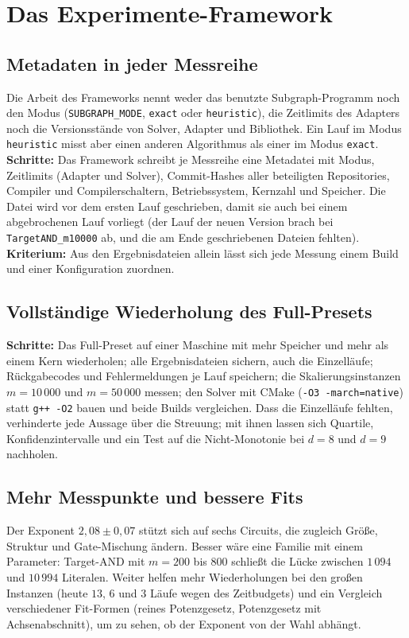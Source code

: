 \section{Das Experimente-Framework}

\subsection{Metadaten in jeder Messreihe}
\label{sec:ausblick_metadaten}

Die Arbeit des Frameworks nennt weder das benutzte Subgraph-Programm noch den Modus (\texttt{SUBGRAPH\_MODE}, \texttt{exact} oder \texttt{heuristic}), die Zeitlimits des Adapters noch die Versionsstände von Solver, Adapter und Bibliothek. Ein Lauf im Modus \texttt{heuristic} misst aber einen anderen Algorithmus als einer im Modus \texttt{exact}. \textbf{Schritte:} Das Framework schreibt je Messreihe eine Metadatei mit Modus, Zeitlimits (Adapter und Solver), Commit-Hashes aller beteiligten Repositories, Compiler und Compilerschaltern, Betriebssystem, Kernzahl und Speicher. Die Datei wird vor dem ersten Lauf geschrieben, damit sie auch bei einem abgebrochenen Lauf vorliegt (der Lauf der neuen Version brach bei \texttt{TargetAND\_m10000} ab, und die am Ende geschriebenen Dateien fehlten). \textbf{Kriterium:} Aus den Ergebnisdateien allein lässt sich jede Messung einem Build und einer Konfiguration zuordnen.

\subsection{Vollständige Wiederholung des Full-Presets}

\textbf{Schritte:} Das Full-Preset auf einer Maschine mit mehr Speicher und mehr als einem Kern wiederholen; alle Ergebnisdateien sichern, auch die Einzelläufe; Rückgabecodes und Fehlermeldungen je Lauf speichern; die Skalierungsinstanzen $m=10\,000$ und $m=50\,000$ messen; den Solver mit CMake (\texttt{-O3 -march=native}) statt \texttt{g++ -O2} bauen und beide Builds vergleichen. Dass die Einzelläufe fehlten, verhinderte jede Aussage über die Streuung; mit ihnen lassen sich Quartile, Konfidenzintervalle und ein Test auf die Nicht-Monotonie bei $d=8$ und $d=9$ nachholen.

\subsection{Mehr Messpunkte und bessere Fits}

Der Exponent $2{,}08\pm0{,}07$ stützt sich auf sechs Circuits, die zugleich Größe, Struktur und Gate-Mischung ändern. Besser wäre eine Familie mit einem Parameter: Target-AND mit $m=200$ bis $800$ schließt die Lücke zwischen $1\,094$ und $10\,994$ Literalen. Weiter helfen mehr Wiederholungen bei den großen Instanzen (heute $13$, $6$ und $3$ Läufe wegen des Zeitbudgets) und ein Vergleich verschiedener Fit-Formen (reines Potenzgesetz, Potenzgesetz mit Achsenabschnitt), um zu sehen, ob der Exponent von der Wahl abhängt.

